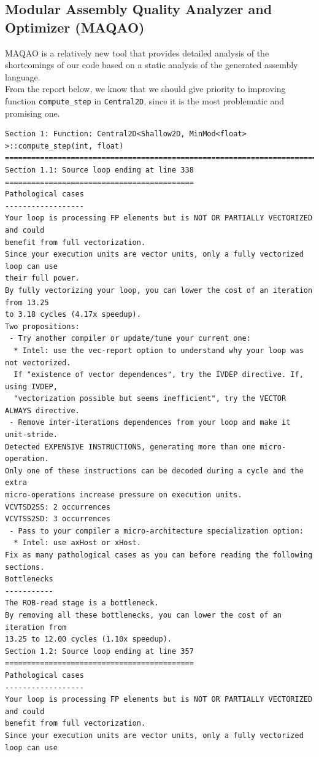 \documentclass[12pt]{article}
\numberwithin{equation}{section}
\begin{document}
\subsection{Modular Assembly Quality Analyzer and Optimizer (MAQAO)}

MAQAO is a relatively new tool that provides detailed analysis of the shortcomings of our code based on a static analysis of the generated assembly language.
\\
From the report below, we know that we should give priority to improving function \texttt{compute\_step} in \texttt{Central2D}, since it is the most problematic and promising one.
\small{
\begin{verbatim}
Section 1: Function: Central2D<Shallow2D, MinMod<float> >::compute_step(int, float)
===================================================================================
Section 1.1: Source loop ending at line 338
===========================================
Pathological cases
------------------
Your loop is processing FP elements but is NOT OR PARTIALLY VECTORIZED and could
benefit from full vectorization.
Since your execution units are vector units, only a fully vectorized loop can use
their full power.
By fully vectorizing your loop, you can lower the cost of an iteration from 13.25
to 3.18 cycles (4.17x speedup).
Two propositions:
 - Try another compiler or update/tune your current one:
  * Intel: use the vec-report option to understand why your loop was not vectorized.
  If "existence of vector dependences", try the IVDEP directive. If, using IVDEP,
  "vectorization possible but seems inefficient", try the VECTOR ALWAYS directive.
 - Remove inter-iterations dependences from your loop and make it unit-stride.
Detected EXPENSIVE INSTRUCTIONS, generating more than one micro-operation.
Only one of these instructions can be decoded during a cycle and the extra
micro-operations increase pressure on execution units.
VCVTSD2SS: 2 occurrences
VCVTSS2SD: 3 occurrences
 - Pass to your compiler a micro-architecture specialization option:
  * Intel: use axHost or xHost.
Fix as many pathological cases as you can before reading the following sections.
Bottlenecks
-----------
The ROB-read stage is a bottleneck.
By removing all these bottlenecks, you can lower the cost of an iteration from
13.25 to 12.00 cycles (1.10x speedup).
Section 1.2: Source loop ending at line 357
===========================================
Pathological cases
------------------
Your loop is processing FP elements but is NOT OR PARTIALLY VECTORIZED and could
benefit from full vectorization.
Since your execution units are vector units, only a fully vectorized loop can use

\end{verbatim}}
\end{document}
